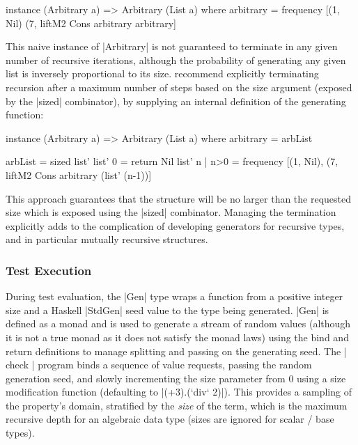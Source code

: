 \begin{code}
instance (Arbitrary a) => Arbitrary (List a) where
   arbitrary = 
          frequency [(1, Nil)
                    (7, liftM2 Cons arbitrary arbitrary]
\end{code}

This naive instance of |Arbitrary| is not guaranteed to terminate
in any given number of recursive iterations,
although the probability of generating any given list
is inversely proportional to its size.
\cite{Claessen2000} recommend explicitly terminating recursion after 
a maximum number of steps based on the size argument
(exposed by the |sized| combinator),
by supplying an internal definition of the generating function:

\begin{code}
instance (Arbitrary a) => Arbitrary (List a) where
   arbitrary = arbList
   
arbList = sized list'
list' 0 = return Nil
list' n | n>0 = 
         frequency [(1, Nil),
                    (7, liftM2 Cons arbitrary (list' (n-1))]
\end{code}

\noindent
This approach guarantees that the structure will be 
no larger than the requested size
which is exposed using the |sized| combinator.
Managing the termination explicitly adds to the complication
of developing \QC generators for recursive types,
and in particular mutually recursive structures.

\subsubsection{Test Execution}

During test evaluation, 
the |Gen| type wraps a function from a positive integer size and 
a Haskell |StdGen| seed value to the type being generated.
|Gen| is defined as a monad and is used to generate  a stream of random values
(although it is not a true monad as it does not satisfy the monad laws)
using the bind and return definitions to manage splitting and passing on the generating seed.
The | check | program binds a sequence of value requests,
passing the random generation seed,
and slowly incrementing the size parameter from 0 using a size modification function
(defaulting to |(+3).(`div` 2)|).
This provides a sampling of the property's domain,
stratified by the \emph{size} of the term,
which is the maximum recursive depth for an algebraic data type
(sizes are ignored for scalar / base types).

